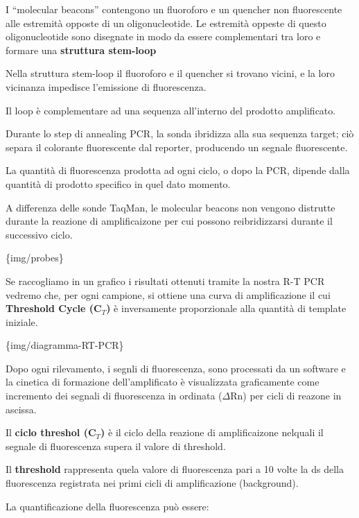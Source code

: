 \documentclass[]{article}
\begin{document}
I ``molecular beacons'' contengono un fluoroforo e un quencher non
fluorescente alle estremità opposte di un oligonucleotide. Le estremità
oppeste di questo oligonucleotide sono disegnate in modo da essere
complementari tra loro e formare una \textbf{struttura stem-loop}

Nella struttura stem-loop il fluoroforo e il quencher si trovano vicini,
e la loro vicinanza impedisce l'emissione di fluorescenza.

Il loop è complementare ad una sequenza all'interno del prodotto
amplificato.

Durante lo step di annealing PCR, la sonda ibridizza alla sua sequenza
target; ciò separa il colorante fluorescente dal reporter, producendo un
segnale fluorescente.

La quantità di fluorescenza prodotta ad ogni ciclo, o dopo la PCR,
dipende dalla quantità di prodotto specifico in quel dato momento.

A differenza delle sonde TaqMan, le molecular beacons non vengono
distrutte durante la reazione di amplificaizone per cui possono
reibridizzarsi durante il successivo ciclo.

\{img/probes\}

Se raccogliamo in un grafico i risultati ottenuti tramite la nostra R-T
PCR vedremo che, per ogni campione, si ottiene una curva di
amplificazione il cui \textbf{Threshold Cycle (C\(_T\))} è inversamente
proporzionale alla quantità di template iniziale.

\{img/diagramma-RT-PCR\}

Dopo ogni rilevamento, i segnli di fluorescenza, sono processati da un
software e la cinetica di formazione dell'amplificato è visualizzata
graficamente come incremento dei segnali di fluorescenza in ordinata
(\(\Delta\)Rn) per cicli di reazone in ascissa.

Il \textbf{ciclo threshol (C\(_T\))} è il ciclo della reazione di
amplificaizone nelquali il segnale di fluorescenza supera il valore di
threshold.

Il \textbf{threshold} rappresenta quela valore di fluorescenza pari a 10
volte la ds della fluorescenza registrata nei primi cicli di
amplificazione (background).

La quantificazione della fluorescenza può essere:
\end{document}
